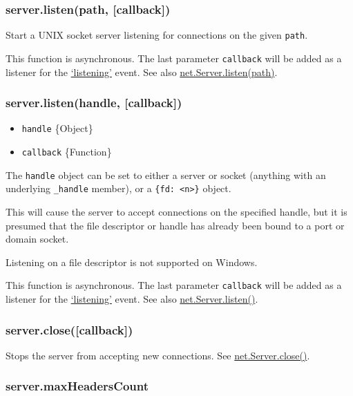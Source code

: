 \subsubsection{server.listen(path, {[}callback{]})}

Start a UNIX socket server listening for connections on the given
\texttt{path}.

This function is asynchronous. The last parameter \texttt{callback} will
be added as a listener for the
\href{net.html\#net\_event\_listening}{`listening'} event. See also
\href{net.html\#net\_server\_listen\_path\_callback}{net.Server.listen(path)}.

\subsubsection{server.listen(handle, {[}callback{]})}

\begin{itemize}
\item
  \texttt{handle} \{Object\}
\item
  \texttt{callback} \{Function\}
\end{itemize}

The \texttt{handle} object can be set to either a server or socket
(anything with an underlying \texttt{\_handle} member), or a
\texttt{\{fd: \textless{}n\textgreater{}\}} object.

This will cause the server to accept connections on the specified
handle, but it is presumed that the file descriptor or handle has
already been bound to a port or domain socket.

Listening on a file descriptor is not supported on Windows.

This function is asynchronous. The last parameter \texttt{callback} will
be added as a listener for the
\href{net.html\#event\_listening\_}{`listening'} event. See also
\href{net.html\#net\_server\_listen\_handle\_callback}{net.Server.listen()}.

\subsubsection{server.close({[}callback{]})}

Stops the server from accepting new connections. See
\href{net.html\#net\_server\_close\_callback}{net.Server.close()}.

\subsubsection{server.maxHeadersCount}

